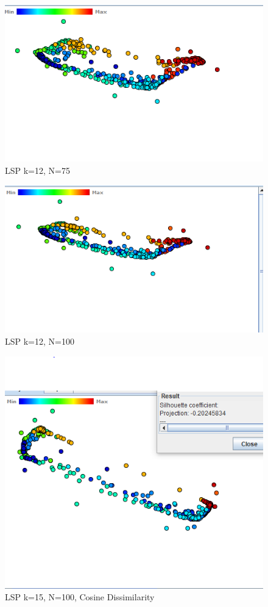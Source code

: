 \documentclass[ 10pt ]{fphw}
\begin{document}
\begin{center}
\begin{figure}[H]
    \centering
	\includegraphics[width=0.65\columnwidth]{task2d/medLSP12-75.PNG}
	\caption{LSP k=12, N=75}
	\label{fig:med12175}
	\end{figure}
\end{center}

\begin{center}
\begin{figure}[H]
    \centering
	\includegraphics[width=0.65\columnwidth]{task2d/medLSP12-100.PNG}
	\caption{LSP k=12, N=100}
	\label{fig:med12100}
	\end{figure}
\end{center}

\begin{center}
\begin{figure}[H]
    \centering
	\includegraphics[width=0.65\columnwidth]{task2d/medLSP15-100-COS.PNG}
	\caption{LSP k=15, N=100, Cosine Dissimilarity}
	\label{fig:med1275}
	\end{figure}
\end{center}
\end{document}
